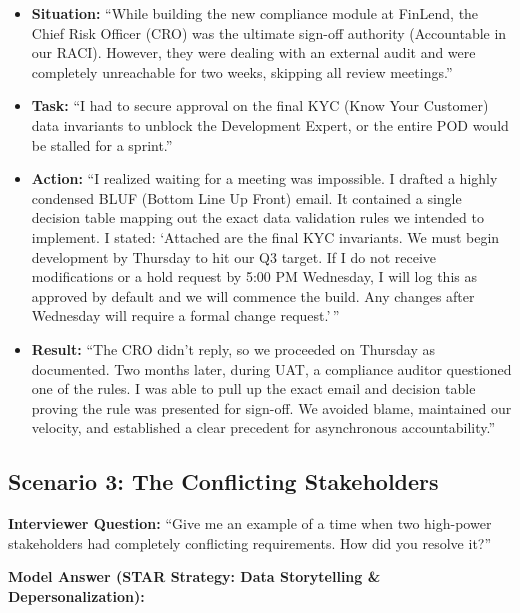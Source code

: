 \begin{itemize}
\tightlist
\item
  \textbf{Situation:} ``While building the new compliance module at
  FinLend, the Chief Risk Officer (CRO) was the ultimate sign-off
  authority (Accountable in our RACI). However, they were dealing with
  an external audit and were completely unreachable for two weeks,
  skipping all review meetings.''
\item
  \textbf{Task:} ``I had to secure approval on the final KYC (Know Your
  Customer) data invariants to unblock the Development Expert, or the
  entire POD would be stalled for a sprint.''
\item
  \textbf{Action:} ``I realized waiting for a meeting was impossible. I
  drafted a highly condensed BLUF (Bottom Line Up Front) email. It
  contained a single decision table mapping out the exact data
  validation rules we intended to implement. I stated: `Attached are the
  final KYC invariants. We must begin development by Thursday to hit our
  Q3 target. If I do not receive modifications or a hold request by 5:00
  PM Wednesday, I will log this as approved by default and we will
  commence the build. Any changes after Wednesday will require a formal
  change request.'\,''
\item
  \textbf{Result:} ``The CRO didn't reply, so we proceeded on Thursday
  as documented. Two months later, during UAT, a compliance auditor
  questioned one of the rules. I was able to pull up the exact email and
  decision table proving the rule was presented for sign-off. We avoided
  blame, maintained our velocity, and established a clear precedent for
  asynchronous accountability.''
\end{itemize}

\subsection{Scenario 3: The Conflicting
Stakeholders}\label{scenario-3-the-conflicting-stakeholders}

\textbf{Interviewer Question:} ``Give me an example of a time when two
high-power stakeholders had completely conflicting requirements. How did
you resolve it?''

\textbf{Model Answer (STAR Strategy: Data Storytelling \&
Depersonalization):}

